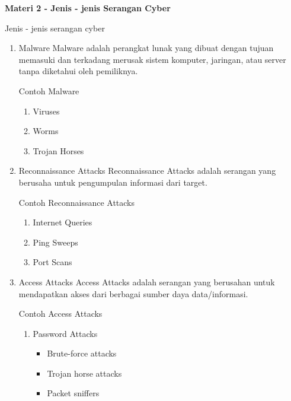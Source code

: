 \documentclass{article}
\begin{document}
    \newpage
    \begin{flushleft}
        \textbf{Materi 2 - Jenis - jenis Serangan Cyber}
        \newline

        Jenis - jenis serangan cyber
        \begin{enumerate}
            \item Malware \newline
            Malware adalah perangkat lunak yang dibuat dengan tujuan memasuki dan terkadang merusak sistem komputer, jaringan, atau server tanpa diketahui oleh pemiliknya.

            Contoh Malware
            \begin{enumerate}
                \item Viruses
                \item Worms
                \item Trojan Horses
            \end{enumerate}

            \item Reconnaissance Attacks \newline
            Reconnaissance Attacks adalah serangan yang berusaha untuk pengumpulan informasi dari target.

            Contoh Reconnaissance Attacks
            \begin{enumerate}
                \item Internet Queries
                \item Ping Sweeps
                \item Port Scans
            \end{enumerate}

            \item Access Attacks \newline
            Access Attacks adalah serangan yang berusahan untuk mendapatkan akses dari berbagai sumber daya data/informasi.

            Contoh Access Attacks
            \begin{enumerate}
                \item Password Attacks
                \begin{itemize}
                    \item Brute-force attacks
                    \item Trojan horse attacks
                    \item Packet sniffers
                \end{itemize}


\end{enumerate}
\end{enumerate}
\end{flushleft}
\end{document}
